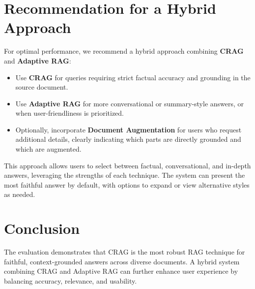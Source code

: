 \section{Recommendation for a Hybrid Approach}

For optimal performance, we recommend a hybrid approach combining \textbf{CRAG} and \textbf{Adaptive RAG}:
\begin{itemize}
    \item Use \textbf{CRAG} for queries requiring strict factual accuracy and grounding in the source document.
    \item Use \textbf{Adaptive RAG} for more conversational or summary-style answers, or when user-friendliness is prioritized.
    \item Optionally, incorporate \textbf{Document Augmentation} for users who request additional details, clearly indicating which parts are directly grounded and which are augmented.
\end{itemize}

This approach allows users to select between factual, conversational, and in-depth answers, leveraging the strengths of each technique. The system can present the most faithful answer by default, with options to expand or view alternative styles as needed.

\section{Conclusion}

The evaluation demonstrates that CRAG is the most robust RAG technique for faithful, context-grounded answers across diverse documents. A hybrid system combining CRAG and Adaptive RAG can further enhance user experience by balancing accuracy, relevance, and usability.
